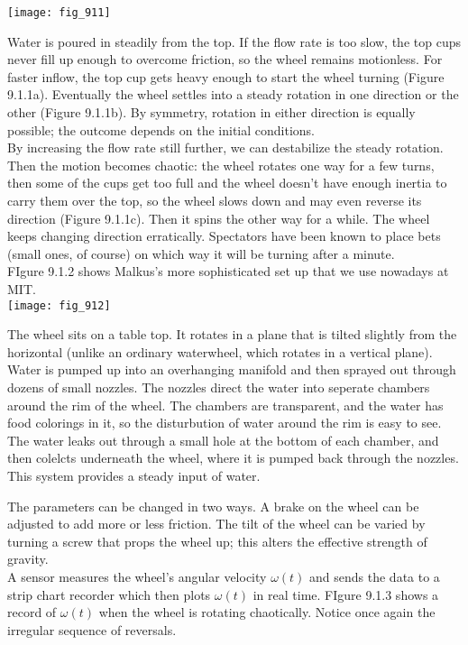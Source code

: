 \documentclass{article}
\newcommand\tab[1][1cm]{\hspace*{#1}}
\begin{document}
\texttt{[image: fig\_911]}

Water is poured in steadily from the top. If the flow rate is too slow, the top cups never fill up enough to overcome friction, so the wheel remains motionless. For faster inflow, the top cup gets heavy enough to start the wheel turning (Figure 9.1.1a). Eventually the wheel settles into a steady rotation in one direction or the other (Figure 9.1.1b). By symmetry, rotation in either direction is equally possible; the outcome depends on the initial conditions. \\ \tab
By increasing the flow rate still further, we can destabilize the steady rotation. Then the motion becomes chaotic: the wheel rotates one way for a few turns, then some of the cups get too full and the wheel doesn't have enough inertia to carry them over the top, so the wheel slows down and may even reverse its direction (Figure 9.1.1c). Then it spins the other way for a while. The wheel keeps changing direction erratically. Spectators have been known to place bets (small ones, of course) on which way it will be turning after a minute. \\ \tab
FIgure 9.1.2 shows Malkus's more sophisticated set up that we use nowadays at MIT. \\
\texttt{[image: fig\_912]}

The wheel sits on a table top. It rotates in a plane that is tilted slightly from the horizontal (unlike an ordinary waterwheel, which rotates in a vertical plane). Water is pumped up into an overhanging manifold and then sprayed out through dozens of small nozzles. The nozzles direct the water into seperate chambers around the rim of the wheel. The chambers are transparent, and the water has food colorings in it, so the disturbution of water around the rim is easy to see. The water leaks out through a small hole at the bottom of each chamber, and then colelcts underneath the wheel, where it is pumped back through the nozzles. This system provides a steady input of water. \\ \tab

The parameters can be changed in two ways. A brake on the wheel can be adjusted to add more or less friction. The tilt of the wheel can be varied by turning a screw that props the wheel up; this alters the effective strength of gravity. \\ \tab
A sensor measures the wheel's angular velocity $\omega (t)$ and sends the data to a strip chart recorder which then plots $\omega (t)$ in real time. FIgure 9.1.3 shows a record of $\omega (t)$ when the wheel is rotating chaotically. Notice once again the irregular sequence of reversals. \\
\end{document}
